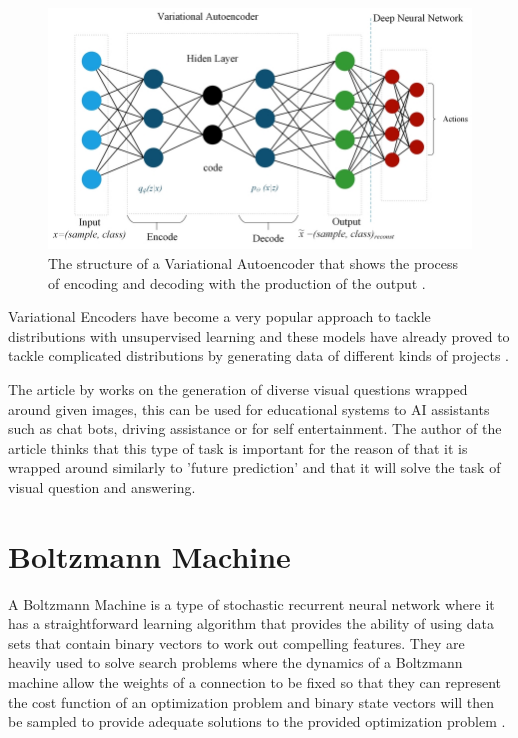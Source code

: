 \begin{figure}[h]
  \centering
  \includegraphics[width=1\linewidth]{graphics/generational_models/vae.png}
  \caption[Caption for VAE]{The structure of a Variational Autoencoder that shows the process of encoding and decoding with the production of the output \protect\footnotemark.}
  \label{fig:VAE}
  \vspace{-2.5mm}
\end{figure}

Variational Encoders have become a very popular approach to tackle distributions with unsupervised learning and these models have already proved to tackle complicated distributions by generating data of different kinds of projects \citet{doersch:2016}.

The article by \citet{jain:2017} works on the generation of diverse visual questions wrapped around given images, this can be used for educational systems to AI assistants such as chat bots, driving assistance or for self entertainment. The author of the article thinks that this type of task is important for the reason of that it is wrapped around similarly to 'future prediction' and that it will solve the task of visual question and answering.   

\pagebreak
\section{Boltzmann Machine}

A Boltzmann Machine  is a type of stochastic recurrent neural network where it has a straightforward learning algorithm that provides the ability of using data sets that contain binary vectors to work out compelling features. They are heavily used to solve search problems where the dynamics of a Boltzmann machine allow the weights of a connection to be fixed so that they can represent the cost function of an optimization problem and binary state vectors will then be sampled to provide adequate solutions to the provided optimization problem \citet{hinton:2007}. 

